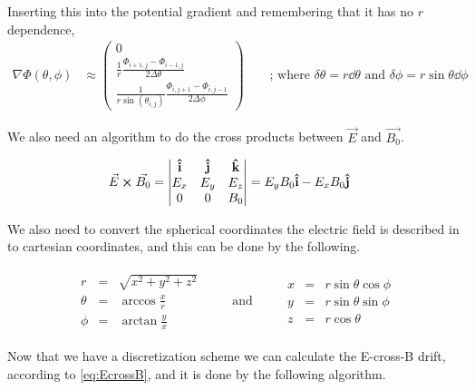 \documentclass[x11names]{article}
\renewcommand{\va}{\vec}
\begin{document}
    Inserting this into the potential gradient and remembering that it has no \(r\) dependence,
    \begin{align}
      \nabla \Phi(\theta,\phi) &\approx
      \begin{pmatrix}
        0
        \\
        \frac{1}{r} \frac{ \Phi_{i+1, j} - \Phi_{i - 1, j} }{2 \Delta \theta}
        \\
        \frac{1}{r\sin(\theta_{i,j})}  \frac{ \Phi_{i, j + 1} - \Phi_{i , j - 1} }{2\Delta \phi}
      \end{pmatrix} \label{eq:discretization}
      \qquad{} \text{; where }  \delta \theta = r\dd{\theta} \text{ and } \delta \phi = r \sin{\theta} \dd \phi 
    \end{align}

    We also need an algorithm to do the cross products between \(\va{E}\) and \(\va{B_0}\).

    \begin{align}
      \va{E} \cross \va{B_0} &= 
      \begin{vmatrix}
        \vu{i} & \vu{j} &\vu{k}
        \\
        E_x & E_y & E_z
        \\
        0 & 0 & B_0
      \end{vmatrix}
      = E_yB_0\vu{i} - E_x B_0 \vu{j}
    \end{align}

    We also need to convert the spherical coordinates the electric field is described in to cartesian coordinates, and this can be done by the following.

    \begin{align}
      \begin{matrix}
        r &=& \sqrt{x^2 + y^2 + z^2}
        \\
        \theta&=&   \arccos{\frac{x}{r}}
        \\
        \phi &=& \arctan{\frac{y}{x}}
      \end{matrix}  
    \qquad \text{ and } \qquad
      \begin{matrix}
        x &=& r\sin{\theta}\cos{\phi}
        \\
        y &=& r\sin{\theta}\sin{\phi}
        \\
        z &=& r\cos{\theta}
      \end{matrix}  
    \end{align}

    Now that we have a discretization scheme we can calculate the E-cross-B drift, according to \cref{eq:EcrossB}, and it is done by the following algorithm.
\end{document}
